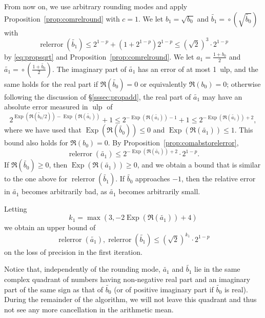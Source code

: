 \documentclass [11pt]{article}
\newcommand {\corr}[1]{{#1}}
\newcommand {\appro}[1]{\widetilde {#1}}
\newcommand {\ulp}[1]{#1~ulp}
\newcommand {\Ulp}{{\operatorname {ulp}}}
\DeclareMathOperator{\Exp}{\operatorname {Exp}}
\newcommand{\relerror}{\operatorname {relerror}}
\newcommand {\round}{\operatorname {\circ}}
\renewcommand {\leq}{\leqslant}
\renewcommand {\geq}{\geqslant}
\begin{document}
From now on, we use arbitrary rounding modes and apply
Proposition~\ref {prop:comrelround} with $c = 1$.
We let $\corr {b_1} = \sqrt {\corr {b_0}}$ and
$\appro {b_1} = \round \left( \sqrt {\appro {b_0}} \right)$ with
\[
\relerror (\appro {b_1}) \leq
2^{1-p} + \left( 1 + 2^{1-p} \right) 2^{1-p}
\leq (\sqrt 2)^3 \cdot 2^{1-p}
\]
by \eqref {eq:propsqrt} and Proposition~\ref {prop:comrelround}.
We let $\corr {a_1} = \frac {1 + \corr {b_0}}{2}$ and
$\appro {a_1} = \round \left( \frac {1 + \appro {b_0}}{2} \right)$.
The imaginary part of $\appro {a_1}$ has an error of at most \ulp{1},
and the same holds for the real part if $\Re (\appro {b_0}) = 0$
or equivalently $\Re (b_0) = 0$; otherwise following the discussion
of \S\ref {sssec:propadd}, the real part of $\appro {a_1}$
may have an absolute error measured in $\Ulp$ of
\begin {equation}
\label {eq:agmfirst}
2^{\Exp (\Re (\appro {b_0} / 2)) - \Exp (\Re (\appro {a_1}))} + 1
\leq
2^{- \Exp (\Re (\appro {a_1})) - 1} + 1
\leq
2^{- \Exp (\Re (\appro {a_1})) + 2},
\end {equation}
where we have used that $\Exp (\Re (\appro {b_0})) \leq 0$
and $\Exp (\Re (\appro {a_1})) \leq 1$.
This bound also holds for $\Re (b_0) = 0$.
By Proposition~\ref {prop:comabstorelerror},
\[
\relerror (\appro {a_1})
\leq
2^{- \Exp (\Re (\appro {a_1})) + 2} \cdot 2^{1-p}.
\]
If $\Re (\appro {b_0}) \geq 0$, then $\Exp (\Re (\appro {a_1})) \geq 0$, and
we obtain a bound that is similar to the one above for
$\relerror (\appro {b_1})$. If $\appro {b_0}$ approaches $-1$, then
the relative error in $\appro {a_1}$ becomes arbitrarily bad, as
$\appro {a_1}$ becomes arbitrarily small.

\noindent
Letting
\begin {equation}
\label {eq:agmk1}
k_1 = \max \left( 3, - 2 \Exp (\Re (\appro {a_1})) + 4 \right)
\end {equation}
we obtain an upper bound of
\begin {equation}
\label {eq:agmerr1}
\relerror (\appro {a_1}), \relerror (\appro {b_1})
\leq
\left( \sqrt 2 \right)^{k_1} \cdot 2^{1-p}
\end {equation}
on the loss of precision in the first iteration.

Notice that, independently of the rounding mode,
$\appro {a_1}$ and $\appro {b_1}$ lie in the same complex quadrant
of numbers having non-negative real part and an imaginary part of the same
sign as that of $\appro {b_0}$
(or of positive imaginary part if $\appro {b_0}$ is real).
During the remainder of the algorithm, we will not leave this quadrant
and thus not see any more cancellation in the arithmetic mean.
\end{document}
